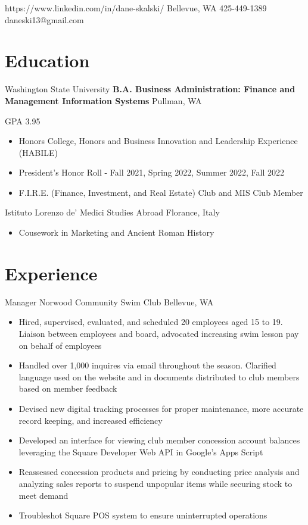 \documentclass[10pt]{article}
\begin{document}
{https://www.linkedin.com/in/dane-skalski/}
{Bellevue, WA}
{425-449-1389}
{daneski13@gmail.com}

\section{Education}
{Washington State University}
{\textbf{B.A. Business Administration: Finance and Management Information Systems}}
{Pullman, WA}
{
    GPA 3.95
    \begin{itemize}
        \item Honors College, Honors and Business Innovation and Leadership Experience (HABILE)
        \item President's Honor Roll - Fall 2021, Spring 2022, Summer 2022, Fall 2022
        \item F.I.R.E. (Finance, Investment, and Real Estate) Club and MIS Club Member
    \end{itemize}
}

{Istituto Lorenzo de' Medici}
{Studies Abroad}
{Florance, Italy}
{
    \begin{itemize}
        \item Cousework in Marketing and Ancient Roman History
    \end{itemize}
}

\section{Experience}
{Manager}
{Norwood Community Swim Club}
{Bellevue, WA}
{
    \begin{itemize}
        \item Hired, supervised, evaluated, and scheduled 20 employees aged 15 to 19. Liaison between employees and board, advocated increasing swim lesson pay on behalf of employees

        \item Handled over 1,000 inquires via email throughout the season. Clarified language used on the website and in documents distributed to club members based on member feedback

        \item Devised new digital tracking processes for proper maintenance, more accurate record keeping, and increased efficiency

        \item Developed an interface for viewing club member concession account balances leveraging the Square Developer Web API in Google's Apps Script

        \item Reassessed concession products and pricing by conducting price analysis and analyzing sales reports to suspend unpopular items while securing stock to meet demand

        \item Troubleshot Square POS system to ensure uninterrupted operations
    \end{itemize}
}
\end{document}
